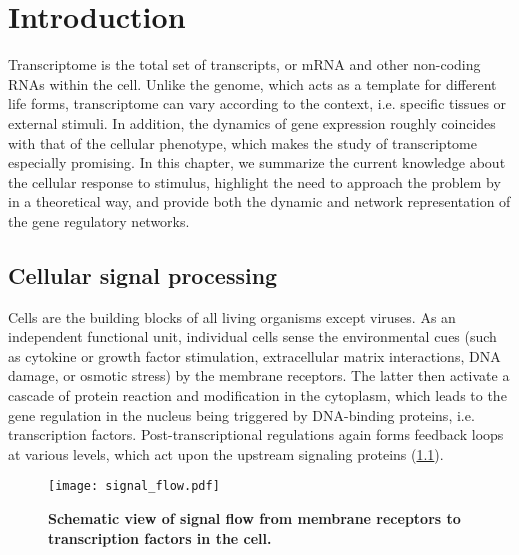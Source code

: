\chapter{Introduction}
Transcriptome is the total set of transcripts, or mRNA and other non-coding RNAs
within the cell. Unlike the genome, which acts as a template for different life
forms, transcriptome can vary according to the context, i.e. specific tissues or
external stimuli. In addition, the dynamics of gene expression roughly coincides 
with that of the cellular phenotype, which makes the study of transcriptome 
especially promising. In this chapter, we summarize the current knowledge about
the cellular response to stimulus, highlight the need to approach the problem
by in a theoretical way, and provide both the dynamic and network representation
of the gene regulatory networks.

\section{Cellular signal processing}
Cells are the building blocks of all living organisms except viruses. As an 
independent functional unit, individual cells sense the environmental cues 
(such as cytokine or growth factor stimulation, extracellular matrix interactions, DNA damage, or osmotic stress) by the membrane receptors. The latter
then activate a cascade of protein reaction and modification in the cytoplasm,
which leads to the gene regulation in the nucleus being triggered by 
DNA-binding proteins, i.e. transcription factors. Post-transcriptional
regulations again forms feedback loops at various levels, which act upon the
upstream signaling proteins (\ref{fig:signal_flow}).

\begin{figure}[!ht]
\begin{center}
\texttt{[image: signal\_flow.pdf]}
\end{center}
\caption[Signal flow]{{\bf Schematic view of signal flow from membrane 
receptors to transcription factors in the cell.}
}
\label{fig:signal_flow}
\end{figure}

